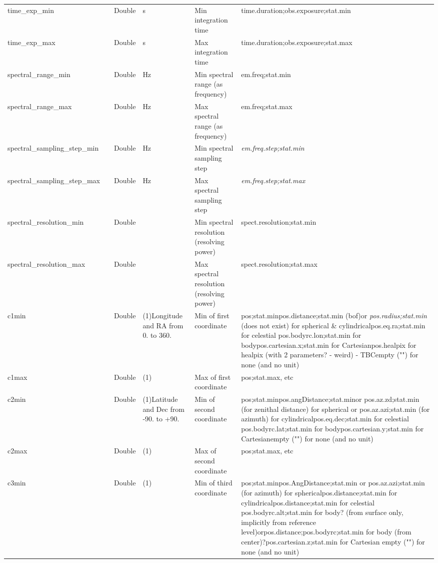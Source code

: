 \documentclass[11pt,a4paper]{ivoa}
\begin{document}
\begin{longtable}{p{3.5cm}p{0.5cm}p{1cm}p{1cm}p{7cm}p{3cm}}
time\_exp\_min&&Double&s&Min integration time&time.duration;obs.exposure;stat.min\\

time\_exp\_max&&Double&s&Max integration time&time.duration;obs.exposure;stat.max\\

spectral\_range\_min&&Double&Hz&Min spectral range (as frequency)&em.freq;stat.min\\

spectral\_range\_max&&Double&Hz&Max spectral range (as frequency)&em.freq;stat.max\\

spectral\_sampling\_step\_min&&Double&Hz&Min spectral sampling step&\emph{em.freq.step;stat.min} \\

spectral\_sampling\_step\_max&&Double&Hz&Max spectral sampling step&\emph{em.freq.step;stat.max }\\

spectral\_resolution\_min&&Double&&Min spectral resolution (resolving power)&spect.resolution;stat.min\\

spectral\_resolution\_max&&Double&&Max spectral resolution (resolving power)&spect.resolution;stat.max\\

c1min&&Double&(1)Longitude and RA from 0. to 360.&Min of first coordinate&pos;stat.minpos.distance;stat.min (bof)or \emph{pos.radius;stat.min} (does not exist)  for spherical \& cylindricalpos.eq.ra;stat.min for celestial pos.bodyrc.lon;stat.min for bodypos.cartesian.x;stat.min for Cartesianpos.healpix for healpix (with 2 parameters?  - weird) - TBCempty ("") for none (and no unit)\\

c1max&&Double&(1)&Max of first coordinate&pos;stat.max, etc\\

c2min&&Double&(1)Latitude and Dec from -90. to +90.&Min of second coordinate&pos;stat.minpos.angDistance;stat.minor pos.az.zd;stat.min (for zenithal distance) for spherical or pos.az.azi;stat.min (for azimuth)  for cylindricalpos.eq.dec;stat.min for celestial pos.bodyrc.lat;stat.min for bodypos.cartesian.y;stat.min for Cartesianempty ("") for none (and no unit)\\

c2max&&Double&(1)&Max of second coordinate&pos;stat.max, etc\\

c3min&&Double&(1)&Min of third coordinate&pos;stat.minpos.AngDistance;stat.min or pos.az.azi;stat.min (for azimuth)  for sphericalpos.distance;stat.min  for cylindricalpos.distance;stat.min for celestial pos.bodyrc.alt;stat.min for body? (from surface only, implicitly from reference level)orpos.distance;pos.bodyrc;stat.min for body (from center)?pos.cartesian.z;stat.min for Cartesian empty ("") for none (and no unit)\\


\end{longtable}
\end{document}

